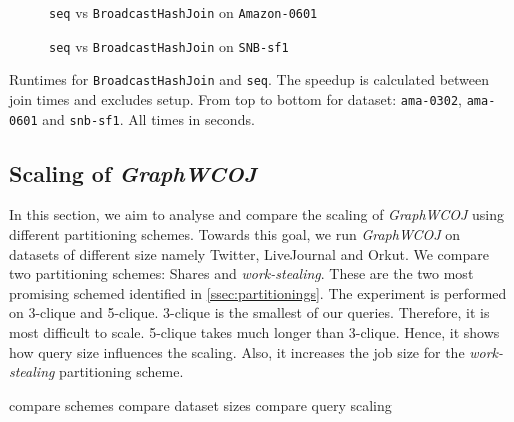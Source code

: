 \begin{figure}
    \centering
    
    \caption{\texttt{seq} vs \texttt{BroadcastHashJoin} on \texttt{Amazon-0601}}
    \label{fig:seq-bar-ama-0601}
\end{figure}

\begin{figure}
    \centering
    
    \caption{\texttt{seq} vs \texttt{BroadcastHashJoin} on \texttt{SNB-sf1}}
    \label{fig:seq-bar-snb-sf1}
\end{figure}

\begin{table}
    \centering

    
    \vspace{0.3cm}

    

    \vspace{0.3cm}
    
    \caption{Runtimes for \texttt{BroadcastHashJoin} and \texttt{seq}.
    The speedup is calculated between join times and excludes setup.
    From top to bottom for dataset: \texttt{ama-0302}, \texttt{ama-0601} and \texttt{snb-sf1}.
    All times in seconds.
    }
    \label{table:seq-vs-bhj}
\end{table}


\subsection{Scaling of \textit{Graph\textsc{WCOJ}}}

In this section, we aim to analyse and compare the scaling of \textit{Graph\textsc{WCOJ}} using different
partitioning schemes.
Towards this goal, we run \textit{Graph\textsc{WCOJ}} on datasets of different size namely Twitter,
LiveJournal and Orkut.
We compare two partitioning schemes: Shares and \textit{work-stealing}.
These are the two most promising schemed identified in \cref{ssec:partitionings}.
The experiment is performed on 3-clique and 5-clique.
3-clique is the smallest of our queries.
Therefore, it is most difficult to scale.
5-clique takes much longer than 3-clique.
Hence, it shows how query size influences the scaling.
Also, it increases the job size for the \textit{work-stealing} partitioning scheme.


compare schemes
compare dataset sizes
compare query scaling
